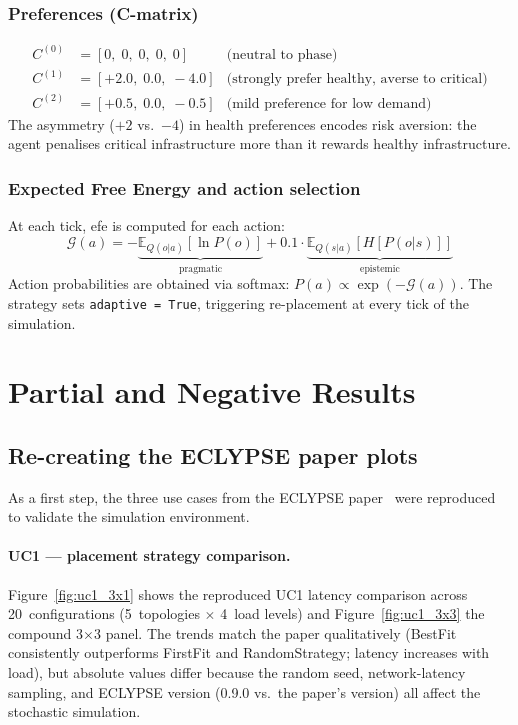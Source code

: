 \documentclass[11pt, a4paper]{article}
\begin{document}
\subsubsection{Preferences (\textbf{C}-matrix)}
\begin{align*}
  C^{(0)} &= [0,\; 0,\; 0,\; 0,\; 0]   & \text{(neutral to phase)} \\
  C^{(1)} &= [+2.0,\; 0.0,\; -4.0]     & \text{(strongly prefer healthy, averse to critical)} \\
  C^{(2)} &= [+0.5,\; 0.0,\; -0.5]     & \text{(mild preference for low demand)}
\end{align*}
The asymmetry ($+2$ vs.\ $-4$) in health preferences encodes risk aversion:
the agent penalises critical infrastructure more than it rewards healthy
infrastructure.

\subsubsection{Expected Free Energy and action selection}
At each tick, \gls{efe} is computed for each action:
\begin{equation}
  \mathcal{G}(a) = -\underbrace{\mathbb{E}_{Q(o|a)}[\ln P(o)]}_{\text{pragmatic}}
                  + 0.1 \cdot \underbrace{\mathbb{E}_{Q(s|a)}[H[P(o|s)]]}_{\text{epistemic}}
\end{equation}
Action probabilities are obtained via softmax:
$P(a) \propto \exp(-\mathcal{G}(a))$.
The strategy sets \texttt{adaptive = True}, triggering re-placement at every
tick of the simulation.

\section{Partial and Negative Results}
\label{sec:negative}

\subsection{Re-creating the ECLYPSE paper plots}
\label{sec:uc1_repro}

As a first step, the three use cases from the ECLYPSE paper~\cite{eclypse}
were reproduced to validate the simulation environment.

\paragraph{UC1 --- placement strategy comparison.}
Figure~\ref{fig:uc1_3x1} shows the reproduced UC1 latency comparison across
20~configurations (5~topologies $\times$ 4~load levels) and
Figure~\ref{fig:uc1_3x3} the compound 3$\times$3 panel.
The trends match the paper qualitatively (BestFit consistently outperforms
FirstFit and RandomStrategy; latency increases with load), but absolute values
differ because the random seed, network-latency sampling, and ECLYPSE version
(0.9.0 vs.\ the paper's version) all affect the stochastic simulation.
\end{document}
